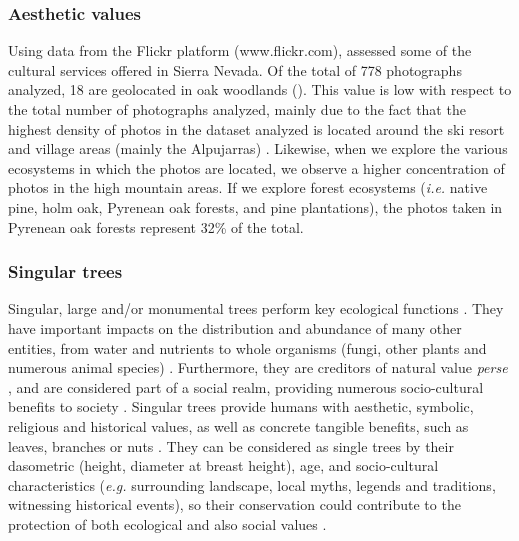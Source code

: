 \subsubsection{Aesthetic values}\label{sec:es:cultural-aesthetic} 
Using data from the Flickr platform (www.flickr.com), \citet{MorenoLlorcaetal2020EvaluatingTourist} assessed some of the cultural services offered in Sierra Nevada. Of the total of 778 photographs analyzed, 18 are geolocated in oak woodlands (). This value is low with respect to the total number of photographs analyzed, mainly due to the fact that the highest density of photos in the dataset analyzed is located around the ski resort and village areas (mainly the Alpujarras) \autocites{RosCandeiraetal2020SocialMedia}. Likewise, when we explore the various ecosystems in which the photos are located, we observe a higher concentration of photos in the high mountain areas. If we explore forest ecosystems (\emph{i.e.} native pine, holm oak, Pyrenean oak forests, and pine plantations), the photos taken in Pyrenean oak forests represent 32\% of the total.

\subsubsection{Singular trees}\label{sec:es:cultural-trees} 
Singular, large and/or monumental trees perform key ecological functions \autocites[\emph{e.g.} nutrient cycling; support complex assemblages of species,][]{Zapponietal2017RoleMonumental}. They have important impacts on the distribution and abundance of many other entities, from water and nutrients to whole organisms (fungi, other plants and numerous animal species) \autocites{LindenmayerLaurance2017EcologyDistribution}. Furthermore, they are creditors of natural value \emph{perse} \autocites{Asciutoetal2016MonumentalTrees}, and are considered part of a social realm, providing numerous socio-cultural benefits to society \autocites{BlicharskaMikusinski2014IncorporatingSocial,MoyaMoya2013MonumentalTrees}. Singular trees provide humans with aesthetic, symbolic, religious and historical values, as well as concrete tangible benefits, such as leaves, branches or nuts \autocites{BlicharskaMikusinski2014IncorporatingSocial}. They can be considered as single trees by their dasometric (height, diameter at breast height), age, and socio-cultural characteristics (\emph{e.g.} surrounding landscape, local myths, legends and traditions, witnessing historical events), so their conservation could contribute to the protection of both ecological and also social values \autocites{BlicharskaMikusinski2014IncorporatingSocial}. 

